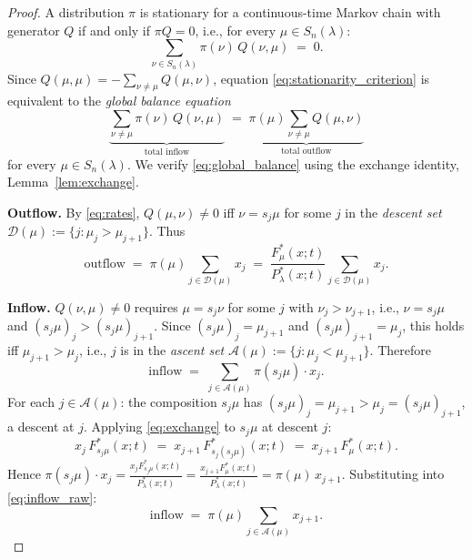 \documentclass[12pt]{article}
\theoremstyle{definition}
\begin{document}
\begin{proof}
A distribution $\pi$ is stationary for a continuous-time Markov chain with
generator $Q$ if and only if $\pi Q = 0$, i.e., for every
$\mu \in S_n(\lambda)$:
\begin{equation}
  \sum_{\nu \in S_n(\lambda)} \pi(\nu)\,Q(\nu,\mu) \;=\; 0.
\label{eq:stationarity_criterion}
\end{equation}
Since $Q(\mu,\mu) = -\sum_{\nu \neq \mu} Q(\mu,\nu)$, equation
\eqref{eq:stationarity_criterion} is equivalent to the
\emph{global balance equation}
\begin{equation}
  \underbrace{\sum_{\nu \neq \mu} \pi(\nu)\,Q(\nu,\mu)}_{\text{total inflow}}
  \;=\;
  \underbrace{\pi(\mu)\sum_{\nu \neq \mu} Q(\mu,\nu)}_{\text{total outflow}}
\label{eq:global_balance}
\end{equation}
for every $\mu \in S_n(\lambda)$.  We verify \eqref{eq:global_balance}
using the exchange identity, Lemma~\ref{lem:exchange}.

\medskip
\noindent\textbf{Outflow.}
By \eqref{eq:rates}, $Q(\mu,\nu) \neq 0$ iff $\nu = s_j\mu$ for some
$j$ in the \emph{descent set} $\mathcal{D}(\mu) := \{j : \mu_j > \mu_{j+1}\}$.
Thus
\begin{equation}
  \text{outflow}
  \;=\; \pi(\mu)\sum_{j \in \mathcal{D}(\mu)} x_j
  \;=\; \frac{F^*_\mu(x;t)}{P^*_\lambda(x;t)}\sum_{j \in \mathcal{D}(\mu)} x_j.
\label{eq:outflow}
\end{equation}

\noindent\textbf{Inflow.}
$Q(\nu,\mu) \neq 0$ requires $\mu = s_j\nu$ for some $j$ with
$\nu_j > \nu_{j+1}$, i.e., $\nu = s_j\mu$ and $(s_j\mu)_j > (s_j\mu)_{j+1}$.
Since $(s_j\mu)_j = \mu_{j+1}$ and $(s_j\mu)_{j+1} = \mu_j$, this holds iff
$\mu_{j+1} > \mu_j$, i.e., $j$ is in the \emph{ascent set}
$\mathcal{A}(\mu) := \{j : \mu_j < \mu_{j+1}\}$.  Therefore
\begin{equation}
  \text{inflow}
  \;=\; \sum_{j \in \mathcal{A}(\mu)} \pi(s_j\mu)\cdot x_j.
\label{eq:inflow_raw}
\end{equation}
For each $j \in \mathcal{A}(\mu)$: the composition $s_j\mu$ has
$(s_j\mu)_j = \mu_{j+1} > \mu_j = (s_j\mu)_{j+1}$, a descent at $j$.
Applying \eqref{eq:exchange} to $s_j\mu$ at descent $j$:
\begin{equation}
  x_j\,F^*_{s_j\mu}(x;t) \;=\; x_{j+1}\,F^*_{s_j(s_j\mu)}(x;t)
  \;=\; x_{j+1}\,F^*_\mu(x;t).
\label{eq:exchange_step}
\end{equation}
Hence
$\pi(s_j\mu)\cdot x_j
= \frac{x_j F^*_{s_j\mu}(x;t)}{P^*_\lambda(x;t)}
= \frac{x_{j+1} F^*_\mu(x;t)}{P^*_\lambda(x;t)}
= \pi(\mu)\,x_{j+1}$.
Substituting into \eqref{eq:inflow_raw}:
\begin{equation}
  \text{inflow}
  \;=\; \pi(\mu)\sum_{j \in \mathcal{A}(\mu)} x_{j+1}.
\label{eq:inflow_simplified}
\end{equation}


\end{proof}
\end{document}

